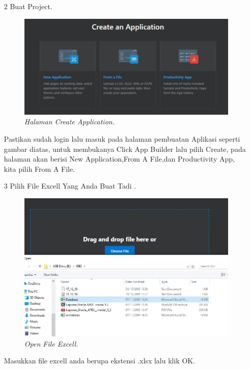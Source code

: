 \begin{enumerate}
\item[2]Buat Project.
\begin{figure}[!htbp]
    \begin{center}
    \includegraphics[scale=0.4]{figures/1.jpg}
    \caption{\textit{Halaman Create Application.}}
    \end{center}
\end{figure}
\par Pastikan sudah login lalu masuk pada halaman pembuatan Aplikasi seperti gambar diatas, untuk membukanya Click App Builder lalu pilih Create, pada halaman akan berisi New Application,From A File,dan Productivity App, kita pilih From A File.

\item[3]Pilih File Excell Yang Anda Buat Tadi .
\begin{figure}[!htbp]
    \begin{center}
    \includegraphics[scale=0.6]{figures/2.jpg}
    \caption{\textit{Open File Excell.}}
    \end{center}
\end{figure}
\par Masukkan file excell anda berupa ekstensi .xlsx lalu klik OK.


\end{enumerate}
